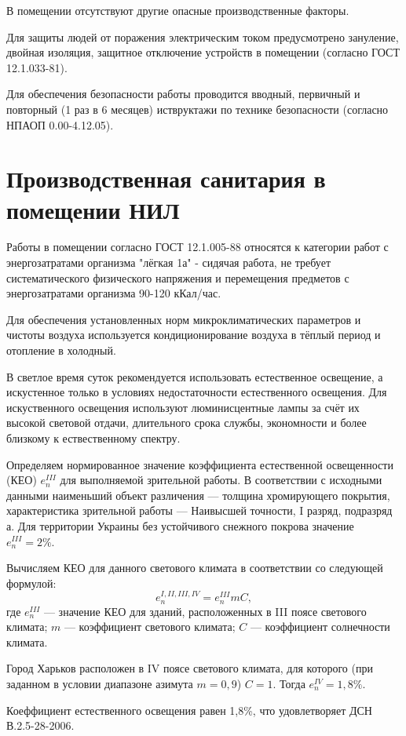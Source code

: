 В помещении отсутствуют другие опасные производственные факторы.

Для защиты людей от поражения электрическим током предусмотрено зануление,
двойная изоляция, защитное отключение устройств в помещении (согласно ГОСТ
12.1.033-81).

Для обеспечения безопасности работы проводится вводный, первичный и повторный (1
раз в 6 месяцев) иствруктажи по технике безопасности (согласно НПАОП
0.00-4.12.05).

\section{Производственная санитария в помещении НИЛ}

Работы в помещении согласно ГОСТ 12.1.005-88 относятся к категории работ с
энергозатратами организма "лёгкая 1а" - сидячая работа, не требует
систематического физического напряжения и перемещения предметов с
энергозатратами организма 90-120 кКал/час.

Для обеспечения установленных норм микроклиматических параметров и чистоты
воздуха используется кондиционирование воздуха в тёплый период и отопление в
холодный.

В светлое время суток рекомендуется использовать естественное освещение, а
искустенное только в условиях недостаточности естественного освещения. Для
искуственного освещения используют люминисцентные лампы за счёт их высокой
световой отдачи, длительного срока службы, экономности и более близкому к
ествественному спектру.

Определяем нормированное значение коэффициента естественной освещенности (КЕО)
$e^{III}_n$ для выполняемой зрительной работы. В соответствии с исходными
данными наименьший объект различения --- толщина хромирующего покрытия,
характеристика зрительной работы --- Наивысшей точности, I разряд, подразряд а.
Для территории Украины без устойчивого снежного покрова значение $e^{III}_n =
2\%$.

Вычисляем КЕО для данного светового климата в соответствии со следующей
формулой:
$$e^{I,II,III,IV}_n = e^{III}_n m C,$$
где $e^{III}_n$ --- значение КЕО для зданий, расположенных в III поясе светового
климата; $m$ --- коэффициент светового климата; $C$ --- коэффициент солнечности
климата.

Город Харьков расположен в IV поясе светового климата, для которого (при
заданном в условии диапазоне азимута $m = 0,9$) $C = 1$. Тогда $e^{IV}_n = 1,8\%$.

Коеффициент естественного освещения равен 1,8\%, что удовлетворяет ДСН
В.2.5-28-2006.

